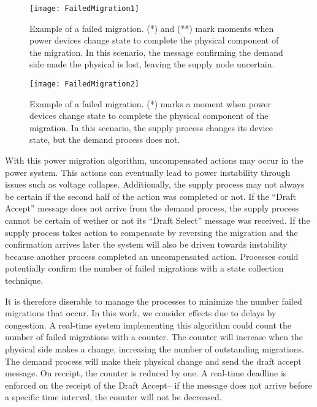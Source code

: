 \begin{figure}
\texttt{[image: FailedMigration1]}
\caption{Example of a failed migration. (*) and (**) mark moments when power devices change state to complete the physical component of the migration. In this scenario, the message confirming the demand side made the physical is lost, leaving the supply node uncertain.} \label{fig:failed-migration-1}
\end{figure}

\begin{figure}
\texttt{[image: FailedMigration2]}
\caption{Example of a failed migration. (*) marks a moment when power devices change state to complete the physical component of the migration. In this scenario, the supply process changes its device state, but the demand process does not.} \label{fig:failed-migration-1}
\end{figure}

With this power migration algorithm, uncompensated actions may occur in the power system.
This actions can eventually lead to power instability through issues such as voltage collapse.
Additionally, the supply process may not always be certain if the second half of the action was completed or not.
If the ``Draft Accept'' message does not arrive from the demand process, the supply process cannot be certain of wether or not its ``Draft Select'' message was received.
If the supply process takes action to compensate by reversing the migration and the confirmation arrives later the system will also be driven towards instability because another process completed an uncompensated action.
Processes could potentially confirm the number of failed migrations with a state collection technique.

It is therefore diserable to manage the processes to minimize the number failed migrations that occur.
In this work, we consider effects due to delays by congestion.
A real-time system implementing this algorithm could count the number of failed migrations with a counter.
The counter will increase when the physical side makes a change, increasing the number of outstanding migrations.
The demand process will make their physical change and send the draft accept message.
On receipt, the counter is reduced by one.
A real-time deadline is enforced on the receipt of the Draft Accept-- if the message does not arrive before a specific time interval, the counter will not be decreased.

